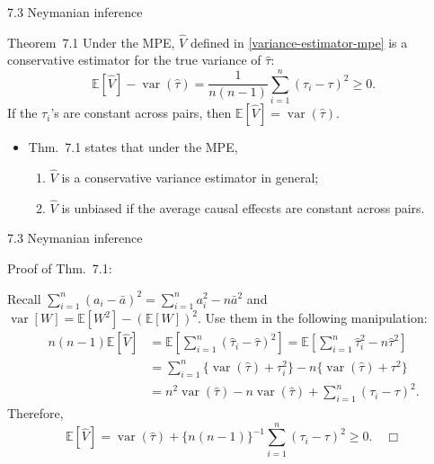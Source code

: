 \documentclass[aspectratio=169, 12pt]{beamer}
\begin{document}
\begin{frame}{7.3 Neymanian inference}
    \begin{keybox}{Theorem~7.1}
        Under the MPE, $\widehat{V}$ defined in \eqref{variance-estimator-mpe} is a conservative estimator for the true variance of $\hat{\tau}$:
        \[
        \mathbb{E}[\widehat{V}] - \operatorname{var}(\hat{\tau}) = \frac{1}{n(n-1)}\sum_{i=1}^{n}(\tau_i-\tau)^2\geq 0.
        \]
        If the $\tau_i$'s are constant across pairs, then $\mathbb{E}[\widehat{V}] = \operatorname{var}(\hat{\tau})$.
        \label{thm-7-1}
    \end{keybox}
    \begin{itemize}
        \item Thm.~7.1 states that under the MPE,
        \begin{enumerate}
            \item $\widehat{V}$ is a conservative variance estimator in general;
            \item $\widehat{V}$ is unbiased if the average causal effecsts are constant across pairs.
        \end{enumerate}
    \end{itemize}
\end{frame}

\begin{frame}{7.3 Neymanian inference}
    
    {
        \small
        Proof of Thm.~7.1:

        Recall $\sum_{i=1}^{n}(a_i-\bar{a})^2=\sum_{i=1}^{n}a_i^2-n\bar{a}^2$ and $\operatorname{var}[W]=\mathbb{E}[W^2]-(\mathbb{E}[W])^2$. Use them in the following manipulation:
        \begin{align*}
            n(n-1)\mathbb{E}[\widehat{V}] 
            &= \mathbb{E}\left[\sum_{i=1}^{n}(\hat{\tau}_i-\hat{\tau})^2\right]
            = \mathbb{E}\left[\sum_{i=1}^{n}\hat{\tau}_i^2-n\hat{\tau}^2\right]\\
            &= \sum_{i=1}^{n}\{\operatorname{var}(\hat{\tau})+\tau_i^2\} - n\{\operatorname{var}(\hat{\tau})+\tau^2\}\\
            &= n^2\operatorname{var}(\hat{\tau}) - n\operatorname{var}(\hat{\tau}) + \sum_{i=1}^{n}(\tau_i-\tau)^2.
        \end{align*}
        Therefore,
        \[
        \mathbb{E}[\widehat{V}] = \operatorname{var}(\hat{\tau}) + \{n(n-1)\}^{-1}\sum_{i=1}^{n}(\tau_i-\tau)^2\geq 0.\quad \Box
        \]
    }
\end{frame}
\end{document}
